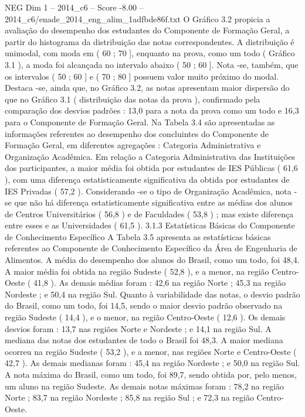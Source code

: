 \begin{textsample}{NEG Dim 1 – 2014\_c6 – Score -8.00 – 2014\_c6/enade\_2014\_eng\_alim\_1adfbde86f.txt}
O Gráfico 3.2 propicia a avaliação do desempenho dos estudantes do Componente de Formação Geral, a partir do histograma da distribuição das notas correspondentes.
A distribuição é unimodal, com moda em ( 60 ; 70 ], enquanto na prova, como um todo ( Gráfico 3.1 ), a moda foi alcançada no intervalo abaixo ( 50 ; 60 ].
Nota -se, também, que os intervalos ( 50 ; 60 ] e ( 70 ; 80 ] possuem valor muito próximo do modal.
Destaca -se, ainda que, no Gráfico 3.2, as notas apresentam maior dispersão do que no Gráfico 3.1 ( distribuição das notas da prova ), confirmado pela comparação dos desvios padrões : 13,0 para a nota da prova como um todo e 16,3 para o Componente de Formação Geral.
Na Tabela 3.4 são apresentadas as informações referentes ao desempenho dos concluintes do Componente de Formação Geral, em diferentes agregações : Categoria Administrativa e Organização Acadêmica.
Em relação a Categoria Administrativa das Instituições dos participantes, a maior média foi obtida por estudantes de IES Públicas ( 61,6 ), com uma diferença estatisticamente significativa da obtida por estudantes de IES Privadas ( 57,2 ).
Considerando -se o tipo de Organização Acadêmica, nota -se que não há diferença estatisticamente significativa entre as médias dos alunos de Centros Universitários ( 56,8 ) e de Faculdades ( 53,8 ) ; mas existe diferença entre esses e as Universidades ( 61,5 ). 3.1.3 Estatísticas Básicas do Componente de Conhecimento Específico A Tabela 3.5 apresenta as estatísticas básicas referentes ao Componente de Conhecimento Específico da Área de Engenharia de Alimentos.
A média do desempenho dos alunos do Brasil, como um todo, foi 48,4.
A maior média foi obtida na região Sudeste ( 52,8 ), e a menor, na região Centro-Oeste ( 41,8 ).
As demais médias foram : 42,6 na região Norte ; 45,3 na região Nordeste ; e 50,4 na região Sul.
Quanto à variabilidade das notas, o desvio padrão do Brasil, como um todo, foi 14,5, sendo o maior desvio padrão observado na região Sudeste ( 14,4 ), e o menor, na região Centro-Oeste ( 12,6 ).
Os demais desvios foram : 13,7 nas regiões Norte e Nordeste ; e 14,1 na região Sul.
A mediana das notas dos estudantes de todo o Brasil foi 48,3.
A maior mediana ocorreu na região Sudeste ( 53,2 ), e a menor, nas regiões Norte e Centro-Oeste ( 42,7 ).
As demais medianas foram : 45,4 na região Nordeste ; e 50,0 na região Sul.
A nota máxima do Brasil, como um todo, foi 89,7, sendo obtida por, pelo menos, um aluno na região Sudeste.
As demais notas máximas foram : 78,2 na região Norte ; 83,7 na região Nordeste ; 85,8 na região Sul ; e 72,3 na região Centro-Oeste.

\end{textsample}
